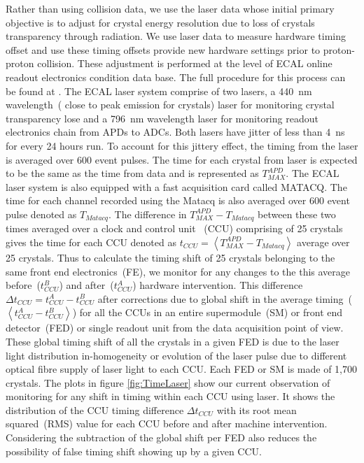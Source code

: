 Rather than using collision data, we use the laser data whose initial primary objective is to adjust for crystal energy resolution due to loss of crystals transparency through radiation. 
We use laser data to measure hardware timing offset and use these timing offsets provide new hardware settings prior to proton-proton collision. These adjustment is performed at the level of ECAL online readout electronics condition data base. The full procedure for this process can be found at \cite{ECALHW}. The ECAL laser system comprise of two lasers, a 440~nm wavelength~( close to peak emission for \pb crystals) laser for monitoring crystal transparency lose and a 796~nm wavelength laser for monitoring readout electronics chain from APDs to ADCs. Both lasers have jitter of less than 4~ns for every 24 hours run. To account for this jittery effect, the timing from the laser is averaged over 600 event pulses. The time for each crystal from laser is expected to be the same as the time from data and is represented as $T^{APD}_{MAX} $. The ECAL laser system is also equipped with a fast acquisition card called MATACQ. The time for each channel recorded using the Matacq is also averaged over 600 event pulse denoted as $ T_{Matacq}$.
The difference in $ T^{APD}_{MAX} - T_{Matacq} $ between these two times averaged over a clock and control unit ~(CCU) comprising of 25 crystals gives the time for each CCU denoted as $ t_{CCU} = \left\langle T^{APD}_{MAX} - T_{Matacq} \right\rangle $ average over 25 crystals.
Thus to calculate the timing shift of 25 crystals belonging to the same front end electronics~(FE), we monitor for any changes to the this average before~($t^{B}_{CCU} $) and after~($t^{A}_{CCU} $) hardware intervention.  This difference $\Delta t_{CCU} = t^{A}_{CCU} - t^{B}_{CCU} $ after corrections due to global shift in the average timing~($\left\langle t^{A}_{CCU} - t^{B}_{CCU} \right\rangle $) for all the CCUs in an entire supermodule~(SM) or front end detector~(FED) or single readout unit from the data acquisition point of view. These global timing shift of all the crystals in a given FED is due to the laser light distribution in-homogeneity or evolution of the laser pulse due to different optical fibre supply of laser light to each CCU. Each FED or SM is made of 1,700 \pb crystals. 
The plots in figure \ref{fig:TimeLaser} show our current observation of  monitoring for any shift in timing within each CCU using laser. It shows the distribution of the CCU timing difference $ \Delta t_{CCU}$ with its root mean squared~(RMS) value for each CCU before and after machine intervention. Considering the subtraction of the global shift per FED also reduces the possibility of false timing shift showing up by a given CCU.

